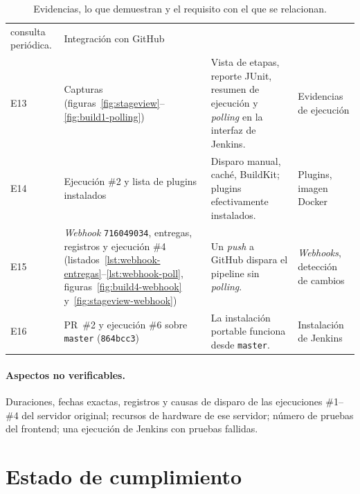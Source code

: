 \documentclass[11pt,a4paper]{article}
\begin{document}
\begin{table}[H]
\begin{tabularx}{\textwidth}{@{}l P{4.1cm} L P{3.2cm}@{}}
consulta periódica. & Integración con GitHub\\
E13 & Capturas (figuras~\ref{fig:stageview}--\ref{fig:build1-polling}) & Vista de etapas, reporte
JUnit, resumen de ejecución y \emph{polling} en la interfaz de Jenkins. & Evidencias de ejecución\\
E14 & Ejecución \#2 y lista de plugins instalados & Disparo manual, caché, BuildKit;
plugins efectivamente instalados. & Plugins, imagen Docker\\
E15 & \emph{Webhook} \texttt{716049034}, entregas, registros y ejecución \#4
(listados~\ref{lst:webhook-entregas}--\ref{lst:webhook-poll}, figuras~\ref{fig:build4-webhook}
y~\ref{fig:stageview-webhook}) & Un \emph{push} a GitHub dispara el pipeline sin \emph{polling}. &
\emph{Webhooks}, detección de cambios\\
E16 & PR~\#2 y ejecución \#6 sobre \texttt{master} (\texttt{864bcc3}) & La instalación portable
funciona desde \texttt{master}. & Instalación de Jenkins\\
\bottomrule
\end{tabularx}
\caption{Evidencias, lo que demuestran y el requisito con el que se relacionan.}
\label{tab:evidencias}
\end{table}

\paragraph{Aspectos no verificables.} Duraciones, fechas exactas, registros y causas de disparo de las
ejecuciones \#1--\#4 del servidor original; recursos de hardware de ese servidor; número de
pruebas del frontend; una ejecución de Jenkins con pruebas fallidas.

\clearpage
\section{Estado de cumplimiento}
\label{sec:cumplimiento2}
\end{document}
